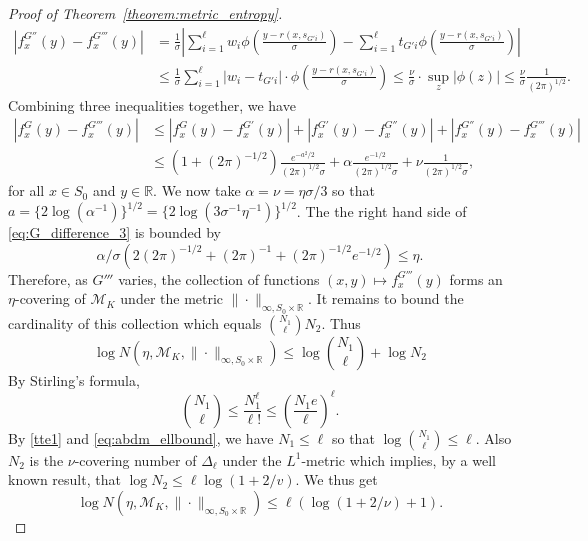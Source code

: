 \documentclass[11pt]{article}
\numberwithin{equation}{section}
\newcommand{\RS}{\mathbb{R}}
\begin{document}
\begin{appendices}
\begin{proof}[Proof of Theorem~\ref{theorem:metric_entropy}]
\[
\begin{split}
|f_x^{G''}(y) - f_x^{G'''}(y)|& = \frac{1}{\sigma}\left|\sum_{i=1}^\ell w_i \phi\left(\frac{y - r(x,s_{G'i})}{\sigma}\right) - \sum_{i=1}^\ell t_{G'i} \phi \left( \frac{y -r(x, s_{G'i})}{\sigma} \right)\right|\\
&\leq \frac{1}{\sigma} \sum_{i=1}^\ell |w_i - t_{G'i}|\cdot  \phi \left(\frac{y -r(x, s_{G'i})}{\sigma} \right) \leq  \frac{\nu}{\sigma} \cdot \sup_{z }|\phi(z)|   \leq \frac{\nu}{\sigma} \frac{1}{(2\pi)^{1/2}}.
\end{split}
\]
Combining three inequalities together, we have
\begin{equation}
\begin{split}
|f_x^{G}(y) - f_x^{G'''}(y)|&\leq 
|f^G_x(y) - f^{G'}_x(y)| + |f_x^{G'}(y) - f_x^{G''}(y)| + |f_x^{G''}(y) - f_x^{G'''}(y)| \\
 &\leq \left(1+(2\pi)^{-1/2}\right)\frac{e^{-a^2/2}}{(2\pi)^{1/2}\sigma}+\alpha \frac{e^{-1/2}}{(2\pi)^{1/2}\sigma}+\nu \frac{1}{(2\pi)^{1/2}\sigma},
\end{split}
\label{eq:G_difference_3}
\end{equation}
for all $x\in S_0$ and $y \in \RS$. We now take $\alpha = \nu = \eta \sigma/3$ so that $a = \{2\log(\alpha^{-1})\}^{1/2} = \{2\log(3 \sigma^{-1}\eta^{-1})\}^{1/2}$. The the right hand side of \eqref{eq:G_difference_3} is bounded by
\[
  \alpha/\sigma\left( 2(2\pi)^{-1/2} + (2\pi)^{-1} + (2\pi)^{-1/2} e^{-1/2}\right)
  \leq \eta. 
\]
Therefore, as $G'''$ varies, the collection of functions $(x, y) \mapsto f_x^{G'''}(y)$ forms an $\eta$-covering of $\mathcal{M}_K$ under the metric $\| \cdot \|_{\infty, S_0 \times \RS}$. It remains to bound the cardinality of this collection which equals $\binom{N_1}{\ell} N_2$. Thus
\begin{equation*}
  \log N(\eta, \mathcal{M}_K, \| \cdot\|_{\infty, S_0 \times \RS}) \leq \log \binom{N_1}{\ell} + \log N_2
\end{equation*}
By Stirling's formula, 
\[\binom{N_1}{\ell} \leq \frac{N_1^\ell}{\ell!}\leq \left(\frac{N_1 e}{\ell}\right)^\ell.
\] 
By \eqref{tte1} and \eqref{eq:abdm_ellbound}, we have $N_1 \leq \ell$ so that $\log \binom{N_1}{\ell} \leq \ell$. Also $N_2$  is the $\nu$-covering number of $\Delta_{\ell}$ under the $L^1$-metric which implies, by a well known result, that $\log N_2 \leq \ell \log (1+2/v)$. We thus get  
\begin{equation*}
\log N(\eta, \mathcal{M}_K, \| \cdot\|_{\infty, S_0 \times \RS}) \leq \ell (\log(1+2/\nu) + 1).
\end{equation*}

\end{proof}
\end{appendices}
\end{document}
